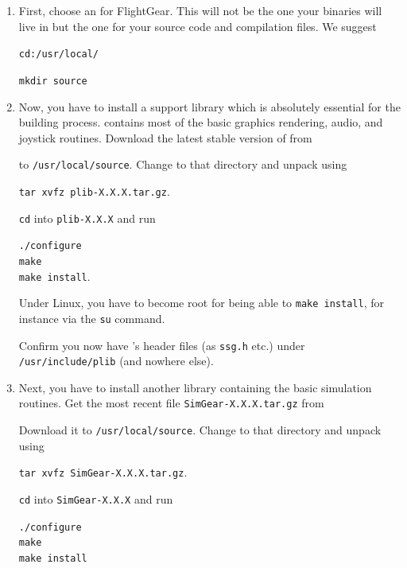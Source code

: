 \begin{enumerate}
\item First, choose an  for FlightGear. This will not be the one your binaries will live in but the one for your source code and compilation files. We suggest

\texttt{cd:/usr/local/}

\texttt{mkdir source}

\item Now, you have to install a support library \PLIB{} which is absolutely essential for the building process. \PLIB{} contains most of the basic graphics
    rendering, audio, and joystick routines. Download the latest stable version of \PLIB{} from
     \medskip

     \medskip

 \noindent
  to \texttt{/usr/local/source}. Change to that directory and unpack \PLIB{} using

        \texttt{tar xvfz plib-X.X.X.tar.gz}.

 \texttt{cd} into \texttt{plib-X.X.X} and run

        \texttt{./configure}\\
        \texttt{make}\\
        \texttt{make install}.

Under Linux, you have to become root for being able to \texttt{make install}, for
instance via the \texttt{su} command.

Confirm you now have \PLIB's header files (as \texttt{ssg.h} etc.) under\\ \texttt{/usr/include/plib} (and nowhere else).

\item Next, you have to install another library \SimGear{} containing the basic simulation routines. Get the most recent file \texttt{SimGear-X.X.X.tar.gz} from
  \medskip

   \medskip

 \noindent
Download it to \texttt{/usr/local/source}. Change to that directory and unpack \SimGear{}
using

        \texttt{tar xvfz SimGear-X.X.X.tar.gz}.

\noindent
 \texttt{cd} into \texttt{SimGear-X.X.X} and run

        \texttt{./configure}\\
        \texttt{make}\\
        \texttt{make install}


\end{enumerate}
